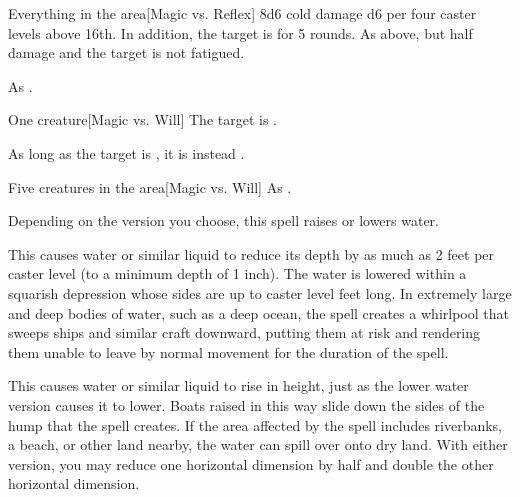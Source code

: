 \begin{spelltarget}{Everything in the area}[Magic vs. Reflex]
    \spellsuccess 8d6 cold damage \add d6 per four caster levels above 16th. In addition, the target is \fatigued for 5 rounds.
    \spellfailure As above, but half damage and the target is not fatigued.
\end{spelltarget}
\spellnotes As .

\spellrng{\rngmed}
\spelldur{\durshort}
\begin{spelltarget}{One creature}[Magic vs. Will]
    \spellsuccess The target is \bewildered.

    As long as the target is \bloodied, it is instead \confused.
\end{spelltarget}

\spellrng{\rngmed}
\begin{spelltarget}{Five creatures in the area}[Magic vs. Will]
    \spellsuccess As .
\end{spelltarget}

\spelldur{\durmed \dismissable}
\spellline
\spelleffect Depending on the version you choose, this spell raises or lowers water.
\par {} This causes water or similar liquid to reduce its depth by as much as 2 feet per caster level (to a minimum depth of 1 inch). The water is lowered within a squarish depression whose sides are up to caster level  feet long. In extremely large and deep bodies of water, such as a deep ocean, the spell creates a whirlpool that sweeps ships and similar craft downward, putting them at risk and rendering them unable to leave by normal movement for the duration of the spell.
\par {} This causes water or similar liquid to rise in height, just as the lower water version causes it to lower. Boats raised in this way slide down the sides of the hump that the spell creates. If the area affected by the spell includes riverbanks, a beach, or other land nearby, the water can spill over onto dry land.
\spellnotes With either version, you may reduce one horizontal dimension by half and double the other horizontal dimension.

